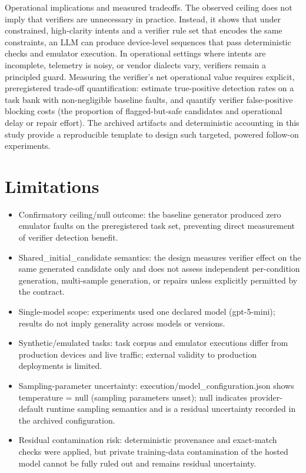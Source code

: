 \documentclass[conference]{IEEEtran}
\begin{document}
Operational implications and measured tradeoffs. The observed ceiling does not imply that verifiers are unnecessary in practice. Instead, it shows that under constrained, high-clarity intents and a verifier rule set that encodes the same constraints, an LLM can produce device-level sequences that pass deterministic checks and emulator execution. In operational settings where intents are incomplete, telemetry is noisy, or vendor dialects vary, verifiers remain a principled guard. Measuring the verifier's net operational value requires explicit, preregistered trade-off quantification: estimate true-positive detection rates on a task bank with non-negligible baseline faults, and quantify verifier false-positive blocking costs (the proportion of flagged-but-safe candidates and operational delay or repair effort). The archived artifacts and deterministic accounting in this study provide a reproducible template to design such targeted, powered follow-on experiments.

\section{Limitations}
\begin{itemize}
\item Confirmatory ceiling/null outcome: the baseline generator produced zero emulator faults on the preregistered task set, preventing direct measurement of verifier detection benefit.
\item Shared\_initial\_candidate semantics: the design measures verifier effect on the same generated candidate only and does not assess independent per-condition generation, multi-sample generation, or repairs unless explicitly permitted by the contract.
\item Single-model scope: experiments used one declared model (gpt-5-mini); results do not imply generality across models or versions.
\item Synthetic/emulated tasks: task corpus and emulator executions differ from production devices and live traffic; external validity to production deployments is limited.
\item Sampling-parameter uncertainty: execution/model\_configuration.json shows temperature = null (sampling parameters unset); null indicates provider-default runtime sampling semantics and is a residual uncertainty recorded in the archived configuration.
\item Residual contamination risk: deterministic provenance and exact-match checks were applied, but private training-data contamination of the hosted model cannot be fully ruled out and remains residual uncertainty.
\end{itemize}
\end{document}
